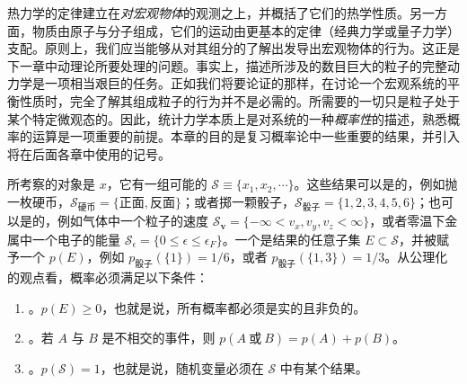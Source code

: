 

热力学的定律建立在\emph{对宏观物体}的观测之上，并概括了它们的热学性质。另一方面，物质由原子与分子组成，它们的运动由更基本的定律（经典力学或量子力学）支配。原则上，我们应当能够从对其组分的了解出发导出宏观物体的行为。这正是下一章中动理论所要处理的问题。事实上，描述所涉及的数目巨大的粒子的完整动力学是一项相当艰巨的任务。正如我们将要论证的那样，在讨论一个宏观系统的平衡性质时，完全了解其组成粒子的行为并不是必需的。所需要的一切只是粒子处于某个特定微观态的。因此，统计力学本质上是对系统的一种\emph{概率性}的描述，熟悉概率的运算是一项重要的前提。本章的目的是复习概率论中一些重要的结果，并引入将在后面各章中使用的记号。

所考察的对象是 $x$，它有一组可能的 $\mathscr{S}\equiv\{x_1,x_2,\cdots\}$。这些结果可以是的，例如抛一枚硬币，$\mathscr{S}_{\text{硬币}}=\{\text{正面},\text{反面}\}$；或者掷一颗骰子，$\mathscr{S}_{\text{骰子}}=\{1,2,3,4,5,6\}$；也可以是的，例如气体中一个粒子的速度 $\mathscr{S}_{\bm{v}}=\{-\infty<v_x,v_y,v_z<\infty\}$，或者零温下金属中一个电子的能量 $\mathscr{S}_{\epsilon}=\{0\le\epsilon\le\epsilon_F\}$。一个是结果的任意子集 $E\subset\mathscr{S}$，并被赋予一个 $p(E)$，例如 $p_{\text{骰子}}(\{1\})=1/6$，或者 $p_{\text{骰子}}(\{1,3\})=1/3$。从公理化的观点看，概率必须满足以下条件：

\begin{enumerate}[label=(\roman*),itemsep=0.25em,topsep=0.4em]
  \item {}。$p(E)\ge0$，也就是说，所有概率都必须是实的且非负的。
  \item {}。若 $A$ 与 $B$ 是不相交的事件，则 $p(A\ \text{或}\ B)=p(A)+p(B)$。
  \item {}。$p(\mathscr{S})=1$，也就是说，随机变量必须在 $\mathscr{S}$ 中有某个结果。
\end{enumerate}

